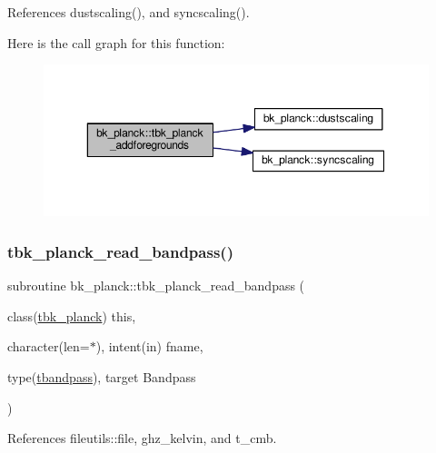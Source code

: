 References dustscaling(), and syncscaling().

Here is the call graph for this function\+:
\nopagebreak
\begin{figure}[H]
\begin{center}
\leavevmode
\includegraphics[width=350pt]{namespacebk__planck_af94e4192bd2f4c8746e6e1108e87a0f0_cgraph}
\end{center}
\end{figure}
\mbox{\label{namespacebk__planck_a073f30d6055fdd0e28e842201c1e9fdf}} 
\subsubsection{\texorpdfstring{tbk\+\_\+planck\+\_\+read\+\_\+bandpass()}{tbk\_planck\_read\_bandpass()}}
{\footnotesize\ttfamily subroutine bk\+\_\+planck\+::tbk\+\_\+planck\+\_\+read\+\_\+bandpass (\begin{DoxyParamCaption}\item[{class(\mbox{\hyperlink{structbk__planck_1_1tbk__planck}{tbk\+\_\+planck}})}]{this,  }\item[{character(len=$\ast$), intent(in)}]{fname,  }\item[{type(\mbox{\hyperlink{structbk__planck_1_1tbandpass}{tbandpass}}), target}]{Bandpass }\end{DoxyParamCaption})\hspace{0.3cm}{\ttfamily [private]}}



References fileutils\+::file, ghz\+\_\+kelvin, and t\+\_\+cmb.

\mbox{\label{namespacebk__planck_a854764740d5b45a861a35309dcc7ab96}} 
